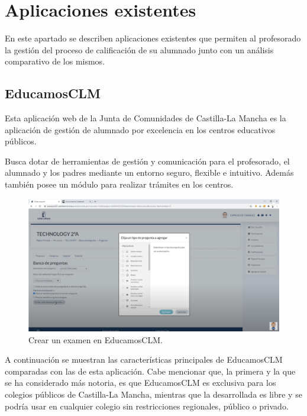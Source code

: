 \chapter{Aplicaciones existentes}
\label{cap:aplicacionesexistentes}

En este apartado se describen aplicaciones existentes que permiten al profesorado la gestión del proceso de calificación de su alumnado junto con un análisis comparativo de los mismos.


\section{EducamosCLM}

Esta aplicación web de la Junta de Comunidades de Castilla-La Mancha\cite{educamosclm} es la aplicación de gestión de alumnado por excelencia en los centros educativos públicos. 

Busca dotar de herramientas de gestión y comunicación para el profesorado, el alumnado y los padres mediante un entorno seguro, flexible e intuitivo. Además también posee un módulo para realizar trámites en los centros.

\begin{figure}[h]
\centering\includegraphics[width=1\linewidth]{figs/educamosCLM2.png}
\caption{Crear un examen en EducamosCLM.\cite{educamosclmyoutube}}
\label{Fig:educamosCLM}
\end{figure}

A continuación se muestran las características principales de EducamosCLM comparadas con las de esta aplicación. Cabe mencionar que, la primera y la que se ha considerado más notoria, es que EducamosCLM es exclusiva para los colegios públicos de Castilla-La Mancha, mientras que la desarrollada es libre y se podría usar en cualquier colegio sin restricciones regionales, público o privado.

